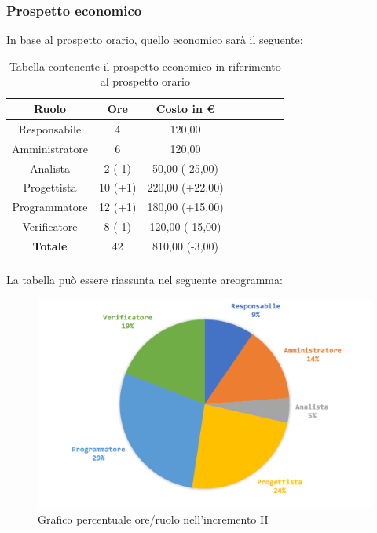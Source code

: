 		\subsubsection{Prospetto economico}
			In base al prospetto orario, quello economico sarà il seguente: 
			
			\begin{longtable}{|c|c|c|c|c|c|c|c}
				\hline
				\rowcolor{lighter-grayer}
				\textbf{Ruolo} & \textbf{Ore} & \textbf{Costo in €} \\
				\hline
				\endfirsthead
				\hline
			Responsabile 	    & 4 & 120,00\\
			\hline 
			\hline
			Amministratore	  & 6 & 120,00\\
			\hline
			\hline
			Analista 				& 2 (-1) & 50,00 (-25,00) \\
			\hline
			\hline
			Progettista 		  & 10 (+1) & 220,00 (+22,00)\\
			\hline
			\hline
			Programmatore 	 & 12 (+1) & 180,00 (+15,00)\\
			\hline
			\hline
			Verificatore 		  & 8 (-1) & 120,00 (-15,00) \\
			\hline
			\textbf{Totale} 	& 42 & 810,00 (-3,00) \\
			\hline
				
				\caption{Tabella contenente il prospetto economico in riferimento al prospetto orario}
			\end{longtable}
			
			La tabella può essere riassunta nel seguente areogramma:
			\begin{figure}[H]
				\centering
				\includegraphics[width=0.8\linewidth]{images/consuntivo/ConsIncr2-2.png}
				\caption{Grafico percentuale ore/ruolo nell'incremento II}
				\label{fig:grafico costi ruolo incremento II}
			\end{figure}
			\pagebreak

